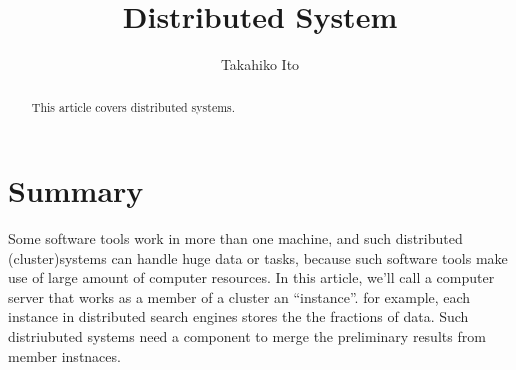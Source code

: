 \documentclass[a4paper, 10pt]{article}
\title{Distributed System}
\author{Takahiko Ito}
\begin{document}
\maketitle
\begin{abstract}
This article covers distributed systems.
\end{abstract}

\section{Summary}

Some software tools work in more than one machine, and such distributed (cluster)systems can handle huge data or tasks, because such software tools make use of large amount of computer resources.
In this article, we'll call a computer server that works as a member of a cluster an ``instance''. for example, each instance in distributed search engines stores the the fractions of data.
Such distriubuted systems need a component to merge the preliminary results from member instnaces.

\end{document}
